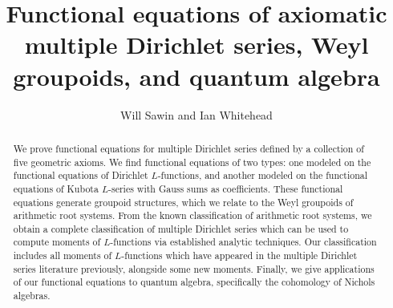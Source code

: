 \documentclass[11pt,letterpaper]{article}
\theoremstyle{definition}
\theoremstyle{remark}
\numberwithin{equation}{section}
\theoremstyle{dotless}
\begin{document}
\title{Functional equations of axiomatic multiple Dirichlet series, Weyl groupoids, and quantum algebra}
\author{Will Sawin and Ian Whitehead}

\maketitle

\begin{abstract}
    We prove functional equations for multiple Dirichlet series defined by a collection of five geometric axioms. We find functional equations of two types: one modeled on the functional equations of Dirichlet $L$-functions, and another modeled on the functional equations of Kubota $L$-series with Gauss sums as coefficients. These functional equations generate groupoid structures, which we relate to the Weyl groupoids of arithmetic root systems. From the known classification of arithmetic root systems, we obtain a complete classification of multiple Dirichlet series which can be used to compute moments of $L$-functions via established analytic techniques. Our classification includes all moments of $L$-functions which have appeared in the multiple Dirichlet series literature previously, alongside some new moments. Finally, we give applications of our functional equations to quantum algebra, specifically the cohomology of Nichols algebras. 
\end{abstract}

\tableofcontents

\pagebreak 
\end{document}
